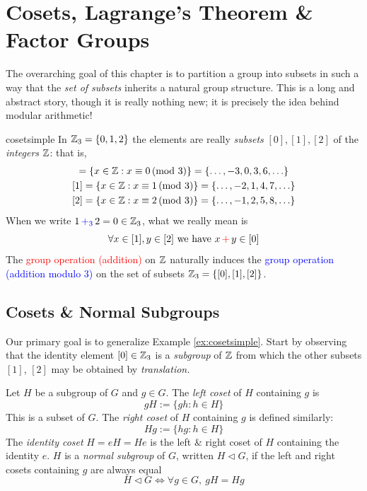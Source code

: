 \graphicspath{{5coset/asy/}}
\setcounter{section}{4}

\section{Cosets, Lagrange's Theorem \& Factor Groups}\label{chap:coset}

The overarching goal of this chapter is to partition a group into subsets in such a way that the \emph{set of subsets} inherits a natural group structure. This is a long and abstract story, though it is really nothing new; it is precisely the idea behind modular arithmetic!

\begin{example}{}{cosetsimple}
	In $\mathbb{Z}_3=\{0,1,2\}$ the elements are really \emph{subsets} $[0],[1],[2]$ of the \emph{integers} $\mathbb{Z}$: that is,
	\begin{gather*}
		[0]=\{x\in\Z:x \equiv 0\negthickspace\pmod 3\} =\{\ldots,-3,0,3,6,\ldots\}\\
		[1]=\{x\in\Z:x \equiv 1\negthickspace\pmod 3\} =\{\ldots,-2,1,4,7,\ldots\}\\
		[2]=\{x\in\Z:x \equiv 2\negthickspace\pmod 3\} =\{\ldots,-1,2,5,8,\ldots\}
	\end{gather*}
	When we write $1\operatorname{\textcolor{blue}{+_3}}2=0\in\mathbb{Z}_3$, what we really mean is
	\[
		\forall x\in[1], y\in[2]
		\text{ we have }
		x\operatorname{\textcolor{red}{+}}y\in [0]
	\]
	The \textcolor{red}{group operation (addition)} on $\mathbb{Z}$ naturally induces the \textcolor{blue}{group operation (addition modulo 3)} on the set of subsets $\mathbb{Z}_3=\{[0],[1],[2]\}$. 
\end{example}


\subsection{Cosets \& Normal Subgroups}\label{sec:cosetnormal}

Our primary goal is to generalize Example \ref{ex:cosetsimple}. Start by observing that the identity element $[0]\in\mathbb{Z}_3$ is a \emph{subgroup} of $\mathbb{Z}$ from which the other subsets $[1]$, $[2]$ may be obtained by \emph{translation.}

\begin{defn}{}{}
	Let $H$ be a subgroup of $G$ and $g\in G$. The \emph{left coset} of $H$ containing $g$ is 
	\[
		gH:=\{gh:h\in H\}\tag{$x\in gH\iff \exists h\in H$ such that $x=gh$}
	\]
	This is a subset of $G$. The \emph{right coset} of $H$ containing $g$ is defined similarly:
	\[
		Hg:=\{hg:h\in H\}
	\]
	The \emph{identity coset} $H=eH=He$ is the left \& right coset of $H$ containing the identity $e$.\smallbreak
	$H$ is a \emph{normal subgroup} of $G$, written $H\triangleleft G$, if the left and right cosets containing $g$ are always equal
	\[
		H\triangleleft G
		\iff
		\forall g\in G,\ gH=Hg
	\]
\end{defn}

